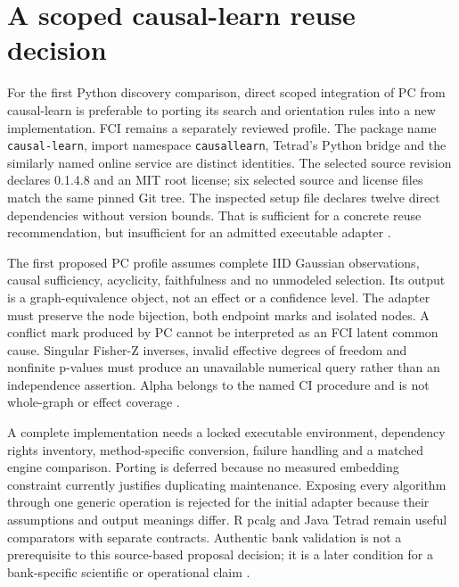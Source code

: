 \section{A scoped causal-learn reuse decision}
\label{exec14:causallearn-decision}

For the first Python discovery comparison, direct scoped integration of PC from
causal-learn is preferable to porting its search and orientation rules into a
new implementation. FCI remains a separately reviewed profile. The package name
\texttt{causal-learn}, import namespace \texttt{causallearn}, Tetrad's Python
bridge and the similarly named online service are distinct identities. The
selected source revision declares 0.1.4.8 and an MIT root license; six selected
source and license files match the same pinned Git tree. The inspected setup
file declares twelve direct dependencies without version bounds. That is
sufficient for a concrete reuse recommendation, but insufficient for an admitted
executable adapter \citep{exec14_causallearn_reuse}.

The first proposed PC profile assumes complete IID Gaussian observations,
causal sufficiency, acyclicity, faithfulness and no unmodeled selection. Its
output is a graph-equivalence object, not an effect or a confidence level. The
adapter must preserve the node bijection, both endpoint marks and isolated
nodes. A conflict mark produced by PC cannot be interpreted as an FCI latent
common cause. Singular Fisher-Z inverses, invalid effective degrees of freedom
and nonfinite p-values must produce an unavailable numerical query rather than
an independence assertion. Alpha belongs to the named CI procedure and is not
whole-graph or effect coverage \citep{exec14_causallearn_reuse}.

A complete implementation needs a locked executable environment, dependency
rights inventory, method-specific conversion, failure handling and a matched
engine comparison. Porting is deferred because no measured embedding constraint
currently justifies duplicating maintenance. Exposing every algorithm through
one generic operation is rejected for the initial adapter because their
assumptions and output meanings differ. R pcalg and Java Tetrad remain useful
comparators with separate contracts. Authentic bank validation is not a
prerequisite to this source-based proposal decision; it is a later condition
for a bank-specific scientific or operational claim
\citep{exec14_causallearn_reuse}.
